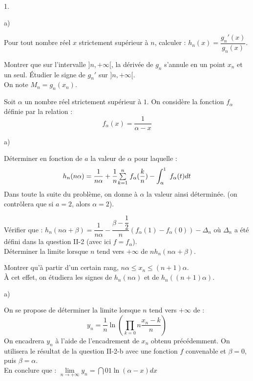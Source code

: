 \documentclass[11pt]{article}%
\begin{document}
\begin{noliste}{1.}
 \setlength{\itemsep}{4mm}
\item 

\begin{noliste}{a)}
 \setlength{\itemsep}{2mm}
\item Pour tout nombre réel $x$ strictement supérieur à $n$, calculer :
$h_{n}(x) = \dfrac{g_{n}{\prime }(x)}{g_{n}(x)}$.

\item Montrer que sur l'intervalle $]n, + \infty \lbrack $, la dérivée
de $g_{n}$ s'annule en un point $x_{n}$ et un seul. Étudier le signe de
$g_{n}{\prime }$ sur $]n, + \infty \lbrack $.\\
On note $M_{n} = g_{n}(x_{n})$.
\end{noliste}

\item Soit $\alpha $ un nombre réel strictement supérieur à $1$. On
considère la fonction $f_{\alpha }$ définie par la relation :
\[
f_{\alpha }(x) = \dfrac{1}{\alpha -x}
\]

\begin{noliste}{a)}
 \setlength{\itemsep}{2mm}
\item Déterminer en fonction de $a$ la valeur de $\alpha $ pour
laquelle :
\[
h_{n}(n\alpha ) = \dfrac{1}{n\alpha } + \dfrac{1}{n}{\textstyle\sum\limits_{k =
1}^{n}}\hspace{.1cm}f_{\alpha }(\dfrac{k}{n})-\displaystyle \int_{\alpha }^{1}\ f_{\alpha }(t)dt
\]
Dans toute la suite du problème, on donne à $\alpha $ la valeur ainsi
déterminée. (on contrôlera que si $a = 2$, alors $\alpha = 2$).

\item Vérifier que : $h_{n}(n\alpha + \beta ) = \dfrac{1}{n\alpha
}-\dfrac{\beta -\dfrac{1}{2}}{n}(f_{\alpha }(1)-f_{\alpha
}(0))-\Delta_{n}$ où $\Delta_{n}$ a été défini dans la question II-2
(avec ici $f = f_{\alpha }$).\\
Déterminer la limite lorsque $n$ tend vers $ + \infty $ de
$nh_{n}(n\alpha
 + \beta )$.
\end{noliste}

\item Montrer qu'à partir d'un certain rang, $n\alpha \leq
x_{n}\leq (n + 1)\alpha $.\\
À cet effet, on étudiera les signes de $h_{n}(n\alpha )$ et de
$h_{n}((n + 1)\alpha )$.

\item 

\begin{noliste}{a)}
 \setlength{\itemsep}{2mm}
\item On se propose de déterminer la limite lorsque $n$ tend vers $ +
\infty $
de :
\[
y_{n} = \dfrac{1}{n}\ln (\prod\limits_{k = 0}{n}\dfrac{x_{n}-k}{n})
\]
On encadrera $y_{n}$ à l'aide de l'encadrement de $x_{n}$ obtenu
précédemment. On utilisera le résultat de la question II-2-b avec une
fonction $f$
convenable et $\beta = 0$, puis $\beta = \alpha $.\\
En conclure que : $\underset{n\rightarrow + \infty }{\lim }y_{n} =
\dint{0}{1}\ln (\alpha -x)dx$


\end{noliste}
\end{noliste}
\end{document}
